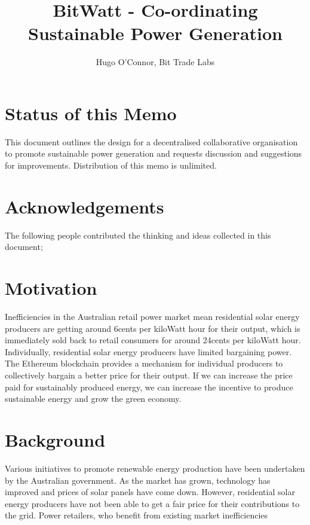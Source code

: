 \documentclass[12pt,twocolumn]{article}
\begin{document}
\title{BitWatt - Co-ordinating Sustainable Power Generation}
\author{Hugo O'Connor, Bit Trade Labs}
\maketitle
\tableofcontents
\newpage
\section {Status of this Memo}

This document outlines the design for a decentralised collaborative organisation to promote sustainable power generation and requests discussion and suggestions for improvements. Distribution of this memo is unlimited.

\section {Acknowledgements}

The following people contributed the thinking and ideas collected in this document;

\section {Motivation}

Inefficiencies in the Australian retail power market mean residential solar energy producers are getting around 6cents per kiloWatt hour for their output, which is immediately sold back to retail consumers for around 24cents per kiloWatt hour. Individually, residential solar energy producers have limited bargaining power. The Ethereum blockchain provides a mechanism for individual producers to collectively bargain a better price for their output. If we can increase the price paid for sustainably produced energy, we can increase the incentive to produce sustainable energy and grow the green economy.

\section {Background}

Various initiatives to promote renewable energy production have been undertaken by the Australian government.  As the market has grown, technology has improved and prices of solar panels have come down. However, residential solar energy producers have not been able to get a fair price for their contributions to the grid. Power retailers, who benefit from existing market inefficiencies 
\end{document}
